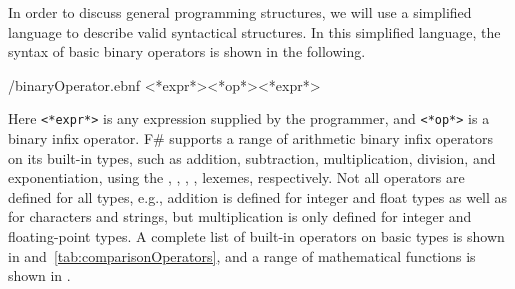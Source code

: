 \documentclass[fsharpNotes.tex]{subfiles}
\begin{document}
In order to discuss general programming structures, we will use a simplified language to describe valid syntactical structures. In this simplified language, the syntax of basic binary operators is shown in the following.
%
\begin{verbatimwrite}{\ebnf/binaryOperator.ebnf}
<*expr*><*op*><*expr*>
\end{verbatimwrite}
%
Here \lstinline[language=syntax]{<*expr*>} is any expression supplied by the programmer, and \lstinline[language=syntax]{<*op*>} is a binary infix operator. F\# supports a range of arithmetic binary infix operators on its built-in types, such as addition, subtraction, multiplication, division, and exponentiation, using the \lexeme{+}, \lexeme{-}, \lexeme{*}, \lexeme{/}, \lexeme{**} lexemes, respectively. Not all operators are defined for all types, e.g., addition is defined for integer and float types as well as for characters and strings, but multiplication is only defined for integer and floating-point types. A complete list of built-in operators on basic types is shown in  and~\ref{tab:comparisonOperators}, and a range of mathematical functions is shown in .
%
\end{document}
